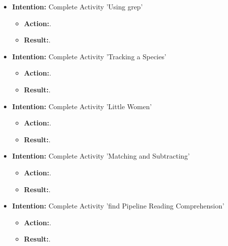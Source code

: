 \documentclass{article}
\begin{document}
\begin{itemize}

\item{\textbf{Intention:} Complete Activity 'Using grep'}

\begin{itemize}
\item{\textbf{Action:}.}

\item{\textbf{Result:}.}

\end{itemize}

\item{\textbf{Intention:} Complete Activity 'Tracking a Species'}

\begin{itemize}
\item{\textbf{Action:}.}

\item{\textbf{Result:}.}

\end{itemize}

\item{\textbf{Intention:} Complete Activity 'Little Women'}

\begin{itemize}
\item{\textbf{Action:}.}

\item{\textbf{Result:}.}

\end{itemize}


\item{\textbf{Intention:} Complete Activity 'Matching and Subtracting'}

\begin{itemize}
\item{\textbf{Action:}.}

\item{\textbf{Result:}.}

\end{itemize}

\item{\textbf{Intention:} Complete Activity 'find Pipeline Reading Comprehension'}

\begin{itemize}
\item{\textbf{Action:}.}

\item{\textbf{Result:}.}

\end{itemize}

\end{itemize}
\end{document}
